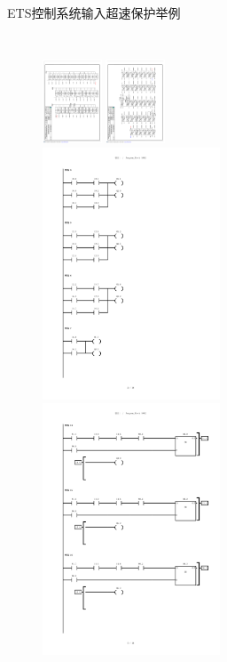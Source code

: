 \documentclass[12pt,hyperref={CJKbookmarks=true}]{beamer} %
\begin{document}
\subsection{}
\begin{frame}{ETS控制系统输入}{超速保护举例}
  		\begin{columns}
\begin{figure}
\includegraphics[angle=90,width=50pt,trim=550 800 40 100,clip]{picture/ets4.pdf}
\includegraphics[angle=90,width=50pt,trim=530 900 50 100,clip]{picture/ets5.pdf}
\\
\includegraphics[angle=0,width=150pt,trim=0 600 0 100,clip]{picture/plc2.pdf}\\
\includegraphics[angle=0,width=150pt,trim=0 600 0 100,clip]{picture/plc5.pdf}\\

\end{figure}
\end{columns}
\end{frame}
\end{document}
